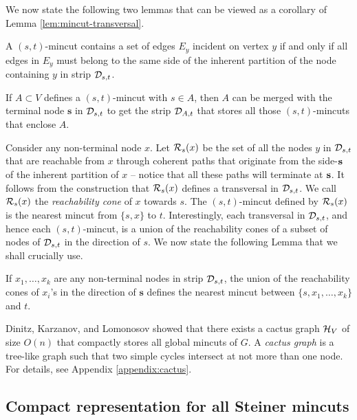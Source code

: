 We now state the following two lemmas that can be viewed as a corollary of Lemma \ref{lem:mincut-transversal}.

\begin{lemma}
A $(s,t)$-mincut contains a set of edges $E_y$ incident on vertex $y$ if and only if all edges in $E_y$ must belong to the same side of the inherent partition of the node containing $y$ in strip ${\cal D}_{s,t}$.
\label{lem:E_y-edges-same-side}
\end{lemma}

\begin{lemma} 
If $A\subset V$ defines a $(s,t)$-mincut with $s\in A$, then $A$ can be merged with the terminal node ${\mathbf s}$ in ${\cal D}_{s,t}$ to get the strip ${\cal D}_{A,t}$ that stores all those $(s,t)$-mincuts that enclose $A$.
\label{lem:strip-A}
\end{lemma}


Consider any non-terminal node $x$. Let ${\cal R}_s(x)$ be the set of all the nodes $y$ in ${\cal D}_{s,t}$ that are reachable from $x$ through coherent paths that originate from the side-${\bf s}$ of the inherent partition of $x$ -- notice that all these paths will terminate at ${\bf s}$. 
It follows from the construction that ${\cal R}_s(x)$ defines a transversal in
${\cal D}_{s,t}$. We call ${\cal R}_s(x)$ the \textit{reachability cone} of $x$ towards $s$. 
The $(s,t)$-mincut defined by ${\cal R}_s(x)$ is the nearest mincut from $\{s,x\}$ to $t$. 
Interestingly, each transversal in ${\cal D}_{s,t}$, and hence each $(s,t)$-mincut, is a union of the reachability cones of a subset of nodes of ${\cal D}_{s,t}$ in the direction of $s$. We now state the following Lemma that we shall crucially use.

\begin{lemma}
If $x_1,\ldots, x_k$ are any non-terminal nodes in strip ${\cal D}_{s,t}$,  the union of the reachability cones of $x_i$'s in the direction of ${\mathbf s}$ defines the nearest mincut between $\{s, x_1,\ldots, x_k\}$ and $t$.
\label{lem:reachability-cones}
\end{lemma} 


Dinitz, Karzanov, and Lomonosov \cite{DL76} showed that there exists a cactus graph ${\cal H}_V$ of size $O(n)$ that compactly stores all global mincuts of $G$. A \textit{cactus graph} is a tree-like graph such that two simple cycles intersect at not more than one node. For details, see Appendix \ref{appendix:cactus}.

\subsection{Compact representation for all Steiner mincuts} \label{subsec:connectivity-carcass}

